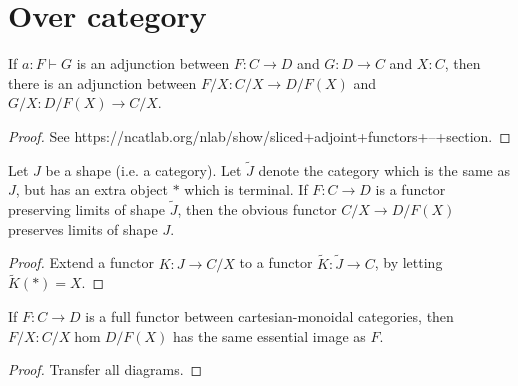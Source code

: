 \section{Over category}


\begin{proposition}
  \label{0-slice-adj}
  \uses{}
  \leanok
  \mathlibok

  If $a : F \vdash G$ is an adjunction between $F : C \to D$ and $G : D \to C$ and $X : C$, then there is an adjunction between $F / X : C / X \to D / F(X)$ and $G / X : D / F(X) \to C / X$.
\end{proposition}
\begin{proof}
  \uses{}
  \leanok

  See https://ncatlab.org/nlab/show/sliced+adjoint+functors+--+section.
\end{proof}


\begin{proposition}
  \label{0-over-lim}
  \uses{}
  \leanok

  Let $J$ be a shape (i.e. a category). Let $\widetilde J$ denote the category which is the same as $J$, but has an extra object $*$ which is terminal.
  If $F : C \to D$ is a functor preserving limits of shape $\widetilde J$, then the obvious functor $C / X \to D / F(X)$ preserves limits of shape $J$.
\end{proposition}
\begin{proof}
  \uses{}
  \leanok

  Extend a functor $K\colon  J \to C / X$ to a functor $\widetilde K\colon \widetilde J \to C$, by letting $\widetilde K (*) = X$.
\end{proof}


\begin{proposition}
  \label{0-ess-image-over}
  \uses{}
  \leanok

  If $F : C \to D$ is a full functor between cartesian-monoidal categories, then $F / X : C / X \hom D / F(X)$ has the same essential image as $F$.
\end{proposition}
\begin{proof}
  \uses{}
  \leanok

  Transfer all diagrams.
\end{proof}
